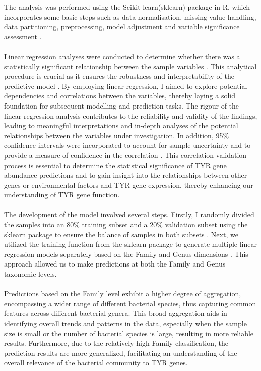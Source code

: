\documentclass[12pt]{article}
\begin{document}
The analysis was performed using the Scikit-learn(sklearn) package in R, which incorporates some basic steps such as data normalisation, missing value handling, data partitioning, preprocessing, model adjustment and variable significance assessment \citep{pedregosa2011scikit,bisong2019introduction,kramer2016scikit}.\\\\
Linear regression analyses were conducted to determine whether there was a statistically significant relationship between the sample variables \citep{maulud2020review}. This analytical procedure is crucial as it ensures the robustness and interpretability of the predictive model \citep{bisong2019introduction}. By employing linear regression, I aimed to explore potential dependencies and correlations between the variables, thereby laying a solid foundation for subsequent modelling and prediction tasks. The rigour of the linear regression analysis contributes to the reliability and validity of the findings, leading to meaningful interpretations and in-depth analyses of the potential relationships between the variables under investigation. In addition, 95\% confidence intervals were incorporated to account for sample uncertainty and to provide a measure of confidence in the correlation \citep{ci1987confidence}. This correlation validation process is essential to determine the statistical significance of TYR gene abundance predictions and to gain insight into the relationships between other genes or environmental factors and TYR gene expression, thereby enhancing our understanding of TYR gene function.\\\\
The development of the model involved several steps. Firstly, I randomly divided the samples into an 80\% training subset and a 20\% validation subset using the sklearn package to ensure the balance of samples in both subsets \citep{kramer2016scikit}. Next, we utilized the training function from the sklearn package to generate multiple linear regression models separately based on the Family and Genus dimensions \citep{bisong2019introduction}. This approach allowed us to make predictions at both the Family and Genus taxonomic levels.\\\\
Predictions based on the Family level exhibit a higher degree of aggregation, encompassing a wider range of different bacterial species, thus capturing common features across different bacterial genera. This broad aggregation aids in identifying overall trends and patterns in the data, especially when the sample size is small or the number of bacterial species is large, resulting in more reliable results. Furthermore, due to the relatively high Family classification, the prediction results are more generalized, facilitating an understanding of the overall relevance of the bacterial community to TYR genes.\\\\
\end{document}
